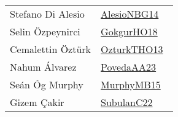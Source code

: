 {\begin{longtable}{p{4cm}p{20cm}}
Stefano {Di Alesio} & \href{works/AlesioNBG14.pdf}{AlesioNBG14}~\cite{AlesioNBG14}\\
Selin {\"{O}}zpeynirci & \href{}{GokgurHO18}~\cite{GokgurHO18}\\
Cemalettin {\"{O}}zt{\"{u}}rk & \href{works/OzturkTHO13.pdf}{OzturkTHO13}~\cite{OzturkTHO13}\\
Nahum {\'{A}}lvarez & \href{works/PovedaAA23.pdf}{PovedaAA23}~\cite{PovedaAA23}\\
Se{\'{a}}n {\'{O}}g Murphy & \href{works/MurphyMB15.pdf}{MurphyMB15}~\cite{MurphyMB15}\\
Gizem {\c{C}}akir & \href{works/SubulanC22.pdf}{SubulanC22}~\cite{SubulanC22}\\
\end{longtable}
}

